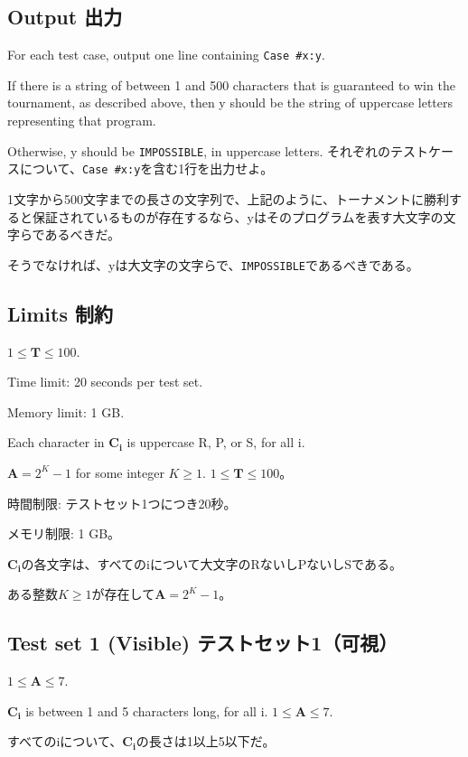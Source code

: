 \documentclass[uplatex,dvipdfmx]{jsarticle} \usepackage{amsmath,amssymb,bm}
\begin{document}
\subsection*{Output 出力}
\begin{paracol}{2}
For each test case, output one line containing {\tt Case \#x:\;y}.

If there is a string of between 1 and 500 characters that is guaranteed to win the tournament, as described above, then y should be the string of uppercase letters representing that program.

Otherwise, y should be {\tt IMPOSSIBLE}, in uppercase letters.
\switchcolumn
それぞれのテストケースについて、{\tt Case \#x:\;y}を含む1行を出力せよ。

1文字から500文字までの長さの文字列で、上記のように、トーナメントに勝利すると保証されているものが存在するなら、yはそのプログラムを表す大文字の文字らであるべきだ。

そうでなければ、yは大文字の文字らで、{\tt IMPOSSIBLE}であるべきである。
\end{paracol}
\subsection*{Limits 制約}
\begin{paracol}{2}
$1 \leq \mathbf{T} \leq 100$.

Time limit: 20 seconds per test set.

Memory limit: 1 GB.

Each character in $\mathbf{C_i}$ is uppercase R, P, or S, for all i.

$\mathbf{A} = 2^K-1$ for some integer $K \geq 1$.
\switchcolumn
$1 \leq \mathbf{T} \leq 100$。

時間制限: テストセット1つにつき20秒。

メモリ制限: 1 GB。

$\mathbf{C_i}$の各文字は、すべてのiについて大文字のRないしPないしSである。

ある整数$K \geq 1$が存在して$\mathbf{A} = 2^K-1$。
\end{paracol}
\subsection*{Test set 1 (Visible) テストセット1（可視）}
\begin{paracol}{2}
$1 \leq \mathbf{A} \leq 7$.

$\mathbf{C_i}$ is between 1 and 5 characters long, for all i.
\switchcolumn
$1 \leq \mathbf{A} \leq 7$.

すべてのiについて、$\mathbf{C_i}$の長さは1以上5以下だ。
\end{paracol}
\end{document}
